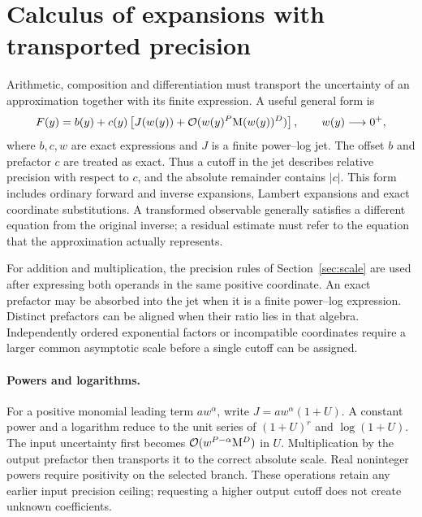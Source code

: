 \section{Calculus of expansions with transported precision}
\label{sec:series-calculus}

Arithmetic, composition and differentiation must transport the uncertainty
of an approximation together with its finite expression. A useful general
form is
\begin{equation}
 F(y)=b(y)+c(y)\left[J(w(y))+\mathcal O(w(y)^P\mathrm M(w(y))^D)\right],
 \qquad w(y)\longrightarrow0^+,
 \label{eq:calculus-carrier}
\end{equation}
where $b,c,w$ are exact expressions and $J$ is a finite power--log jet.
The offset $b$ and prefactor $c$ are treated as exact. Thus a cutoff in
the jet describes relative precision with respect to $c$, and the absolute
remainder contains $|c|$. This form includes ordinary forward and inverse expansions, Lambert expansions and exact coordinate substitutions. A transformed observable generally satisfies a different equation from the original inverse; a residual estimate must refer to the equation that the approximation actually represents.

For addition and multiplication, the precision rules of
Section~\ref{sec:scale} are used after expressing both operands in the same
positive coordinate. An exact prefactor may be absorbed into the jet when
it is a finite power--log expression. Distinct prefactors can be aligned
when their ratio lies in that algebra. Independently ordered exponential factors or incompatible coordinates require a larger common asymptotic scale before a single cutoff can be assigned.

\paragraph{Powers and logarithms.}
For a positive monomial leading term $a w^\alpha$, write
$J=a w^\alpha(1+U)$. A constant power and a logarithm reduce to the unit
series of $(1+U)^r$ and $\log(1+U)$. The input uncertainty first becomes
$\mathcal O(w^{P-\alpha}\mathrm M^D)$ in $U$. Multiplication by the output prefactor
then transports it to the correct absolute scale. Real noninteger powers
require positivity on the selected branch. These operations retain any
earlier input precision ceiling; requesting a higher output cutoff does
not create unknown coefficients.


